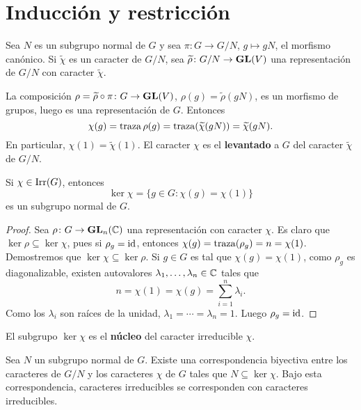 \chapter{Inducción y restricción}

Sea $N$ es un subgrupo normal de $G$ y sea $\pi\colon G\to G/N$, $g\mapsto gN$, el morfismo canónico. Si 
$\widetilde{\chi}$ es un caracter de $G/N$, 
sea $\widetilde{\rho}\colon G/N\to\mathbf{GL}(V)$ una representación de $G/N$ con caracter $\widetilde{\chi}$. 

La composición $\rho=\widetilde{\rho}\circ\pi\colon G\to \mathbf{GL}(V)$, $\rho(g)=\widetilde{\rho}(gN)$, 
es un morfismo de grupos, luego es una representación de $G$. 
Entonces 
\[
\chi(g)=\operatorname{traza}{\rho(g)}=\operatorname{traza}(\widetilde{\chi}(gN))=\widetilde{\chi}(gN).
\]
En particular, $\chi(1)=\widetilde{\chi}(1)$. El caracter $\chi$ es el \textbf{levantado} a $G$ del caracter
$\widetilde{\chi}$ de $G/N$. 

\begin{lemma}
Si $\chi\in\operatorname{Irr}(G)$, entonces
\[
\ker\chi=\{g\in G:\chi(g)=\chi(1)\}
\]
es un subgrupo normal de $G$. 
\end{lemma}

\begin{proof}
Sea $\rho\colon G\to\mathbf{GL}_n(\mathbb{C})$ una representación con caracter $\chi$. Es claro que
$\ker\rho\subseteq\ker\chi$, pues si $\rho_g=\operatorname{id}$, entonces
$\chi(g)=\operatorname{traza}(\rho_g)=n=\chi(1)$. Demostremos que 
$\ker\chi\subseteq\ker\rho$. Si $g\in G$ es tal que $\chi(g)=\chi(1)$, como
$\rho_g$ es diagonalizable, existen autovalores $\lambda_1,\dots,\lambda_n\in\mathbb{C}$ tales que
\[
n=\chi(1)=\chi(g)=\sum_{i=1}^n\lambda_i.
\]
Como los $\lambda_i$ son raíces de la unidad, 
$\lambda_1=\cdots=\lambda_n=1$. Luego $\rho_g=\operatorname{id}$. 
\end{proof}

El subgrupo $\ker\chi$ es el \textbf{núcleo} del caracter irreducible $\chi$. 

\begin{theorem}
Sea $N$ un subgrupo normal de $G$. Existe una correspondencia biyectiva
entre los caracteres de $G/N$ y los caracteres $\chi$ de $G$ tales que 
$N\subseteq\ker\chi$. Bajo esta correspondencia, 
caracteres irreducibles se corresponden con caracteres irreducibles.
\end{theorem}

